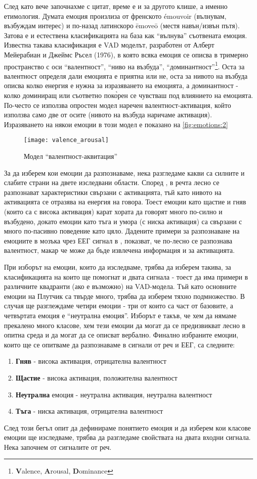 \documentclass[main.tex]{subfiles}
\begin{document}
След като вече започнахме с цитат, време е и за другото клише, а именно етимология. Думата емоция произлиза от френското émouvoir (вълнувам, възбуждам интерес) и по-назад латинскоро ēmoveō (местя навън/извън пътя). Затова е и естествена класификацията на база как ``вълнува'' съотвената емоция. Известна такава класификация е VAD моделът, разработен от Алберт Мейерабиан и Джеймс Ръсел (1976), в която всяка емоция се описва в тримерно пространство с оси ``валентност'', ``ниво на възбуда'', ``доминантност''\footnote{\textbf{V}alence, \textbf{A}rousal, \textbf{D}ominance}. Оста за валентност определя дали емоцията е приятна или не, оста за нивото на възбуда описва колко енергия е нужна за изразяването на емоцията, а доминантност - колко доминиращ или съответно пок\`{о}рен се чувстваш под влиянието на емоцията. По-често се използва опростен модел наречен валентност-активация, който използва само две от осите (нивото на възбуда наричаме активация). Изразяването на някои емоции в този модел е показано на \autoref{fig:emotions:2}
\begin{figure}[ht]%
    \centering
    \texttt{[image: valence\_arousal]}
    \caption{Модел ``валентност-аквитация''}
    \label{fig:emotions:2}
\end{figure}

За да изберем кои емоции да разпознаваме, нека разгледаме какви са силните и слабите страни на двете изследвани области.
Според \cite{survey}, в речта лесно се разпознават характеристики свързани с активацията, тъй като нивото на активацията се отразява на енергия на говора. Тоест емоции като щастие и гняв (които са с висока активация) карат хората да говорят много по-силно и възбудено, докато емоции като тъга и умора (с ниска активация) са свързани с много по-пасивно поведение като цяло.
Дадените примери за разпознаване на емоциите в мозъка чрез ЕЕГ сигнал в \cite{brain_survey}, показват, че по-лесно се разпознава валентност, макар че може да бъде извлечена информация и за активацията.

При изборът на емоции, които да изследваме, трябва да изберем такива, за класификацията на които ще помогнат и двата сигнала - тоест да има примери в различните квадранти (ако е възможно) на VAD-модела. Тъй като основните емоции на Плутчик са твърде много, трябва да изберем тяхно подмножество. В случая ще разглеждаме четири емоции - три от които са част от базовите, а четвъртата емоция е ``неутрална емоция''. Изборът е такъв, че хем да нямаме прекалено много класове, хем тези емоции да могат да се предизвикват лесно в опитна среда и да могат да се описват вербално.
Финално избраните емоции, които ще се опитваме да разпознаваме в сигнали от реч и ЕЕГ, са следните:
\begin{enumerate}
    \item \textbf{Гняв} - висока активация, отрицателна валентност
    \item \textbf{Щастие} - висока активация, положителна валентност
    \item \textbf{Неутрална} емоция - неутрална активация, неутрална валентност
    \item \textbf{Тъга} - ниска активация, отрицателна валентност
\end{enumerate}

След този бегъл опит да дефинираме понятието емоция и да изберем кои класове емоции ще изследваме, трябва да разгледаме свойствата на двата входни сигнала. Нека започнем от сигналите от реч. 
\end{document}
